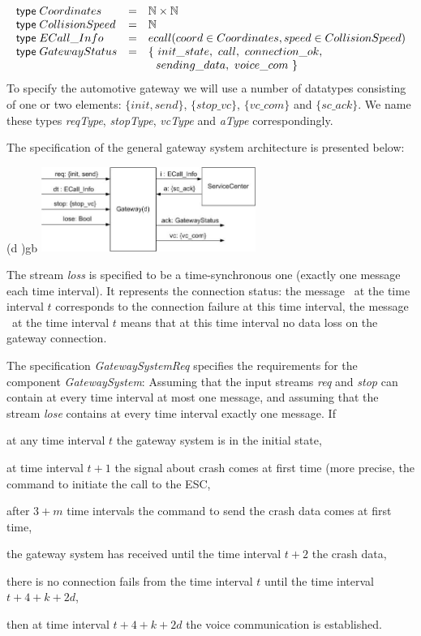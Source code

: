 %
\[
\begin{array}{lcl}
  \textsf{type\;} Coordinates &=& {\mathbb N} \times {\mathbb N}
  \\
  \textsf{type\;} CollisionSpeed &=& {\mathbb N}
  \\
	\textsf{type\;} ECall\_Info &=& ecall(coord \in Coordinates, speed \in CollisionSpeed)
	\\
	\textsf{type\;} GatewayStatus &=& 
	\{~ init\_state,~ call,~ connection\_ok,\\
	&& ~ ~sending\_data,~ voice\_com ~\}
\end{array}
\]
To specify the automotive gateway we will use a number of datatypes 
consisting of one or two elements: 
$\{init, send\}$, $\{stop\_vc\}$, $\{vc\_com\}$ and $\{sc\_ack\}$. 
We name these types \emph{reqType}, \emph{stopType}, \emph{vcType} and \emph{aType} correspondingly.

The \Focus specification of the general gateway system architecture is presented below:

\begin{spec}{(\nconst d \in \Nat)}{gb}
\centering \includegraphics[width=7cm]{fig/gatewaySystem.jpg}
\end{spec} 

\noindent
The stream \emph{loss} is specified to be a time-synchronous one (exactly one message each time interval). 
It represents the connection status: 
the message \ntrue~at the time interval $t$ corresponds to the connection 
failure at this time interval, the message \nfalse~at the time interval $t$ means that 
at this time interval no data loss on the gateway connection.

The specification \emph{GatewaySystemReq} specifies the requirements for the component \emph{GatewaySystem}:
Assuming that the input streams \emph{req} and \emph{stop} can contain at every time interval at most one message, and assuming that the stream \emph{lose} contains at every time interval exactly one message. 
If 
\begin{itemize*}
	\item 
	at any time interval $t$ the gateway system is in the initial state, 
	\item
	at time interval $t+1$ the signal about crash comes at first time 
	(more precise, the command to initiate the call to the ESC,
	\item 
	after $3+m$ time intervals the command to send the crash data comes at first time,
	\item 
	the gateway system has received until the time interval $t+2$ the crash data,  
	\item 
	there is no connection fails from the time interval $t$ until the time interval $t + 4 + k + 2d$,
	\end{itemize*}
%
then at time interval $t + 4 + k + 2d$ the voice communication is established.


